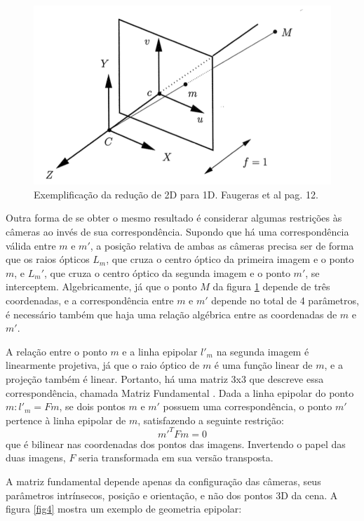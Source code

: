 \begin{figure}
	\centering
		\includegraphics{Imagens/figura2-3.png}
	\caption{Exemplificação da redução de 2D para 1D. Faugeras et al \cite{Faugeras-Geometry} pag. 12.}
	\label{fig3}
\end{figure}

Outra forma de se obter o mesmo resultado é considerar algumas restrições às câmeras ao invés de sua correspondência. Supondo que há uma correspondência válida entre $m$ e $m'$, a posição relativa de ambas as câmeras precisa ser de forma que os raios ópticos $L_{m}$, que cruza o centro óptico da primeira imagem e o ponto $m$, e $L_{m}'$, que cruza o centro óptico da segunda imagem e o ponto $m'$, se interceptem. Algebricamente, já que o ponto $M$ da figura \ref{fig3} depende de três coordenadas, e a correspondência entre $m$ e $m'$ depende no total de 4 parâmetros, é necessário também que haja uma relação algébrica entre as coordenadas de $m$ e $m'$.

A relação entre o ponto $m$ e a linha epipolar $l'_{m}$ na segunda imagem é linearmente projetiva, já que o raio óptico de $m$ é uma função linear de $m$, e a projeção também é linear. Portanto, há uma matriz 3x3 que descreve essa correspondência, chamada Matriz Fundamental \cite{Faugeras-Geometry}. Dada a linha epipolar do ponto $m: l'_{m} = Fm$, se dois pontos $m$ e $m'$ possuem uma correspondência, o ponto $m'$ pertence à linha epipolar de $m$, satisfazendo a seguinte restrição: 
\begin{equation}\label{eq5}m'^{T}Fm = 0\end{equation} que é bilinear nas coordenadas dos pontos das imagens. Invertendo o papel das duas imagens, $F$ seria transformada em sua versão transposta.

A matriz fundamental depende apenas da configuração das câmeras, seus parâmetros intrínsecos, posição e orientação, e não dos pontos 3D da cena. A figura \ref{fig4} mostra um exemplo de geometria epipolar:

